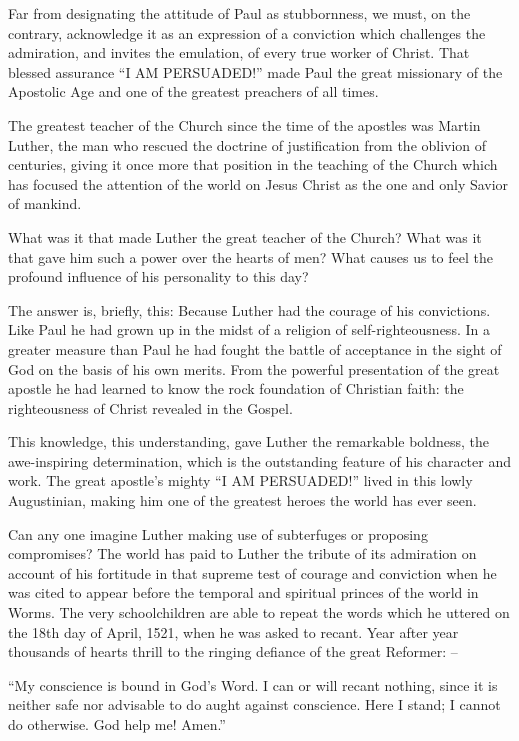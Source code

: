 \documentclass[
]{book}
\begin{document}
Far from designating the attitude of Paul as stubbornness, we must, on the contrary, acknowledge it as an expression of a conviction which challenges the admiration, and invites the emulation, of every true worker of Christ. That blessed assurance ``I AM PERSUADED!'' made Paul the great missionary of the Apostolic Age and one of the greatest preachers of all times.

The greatest teacher of the Church since the time of the apostles was Martin Luther, the man who rescued the doctrine of justification from the oblivion of centuries, giving it once more that position in the teaching of the Church which has focused the attention of the world on Jesus Christ as the one and only Savior of mankind.

What was it that made Luther the great teacher of the Church? What was it that gave him such a power over the hearts of men? What causes us to feel the profound influence of his personality to this day?

The answer is, briefly, this: Because Luther had the courage of his convictions. Like Paul he had grown up in the midst of a religion of self-righteousness. In a greater measure than Paul he had fought the battle of acceptance in the sight of God on the basis of his own merits. From the powerful presentation of the great apostle he had learned to know the rock foundation of Christian faith: the righteousness of Christ revealed in the Gospel.

This knowledge, this understanding, gave Luther the remarkable boldness, the awe-inspiring determination, which is the outstanding feature of his character and work. The great apostle's mighty ``I AM PERSUADED!'' lived in this lowly Augustinian, making him one of the greatest heroes the world has ever seen.

Can any one imagine Luther making use of subterfuges or proposing compromises? The world has paid to Luther the tribute of its admiration on account of his fortitude in that supreme test of courage and conviction when he was cited to appear before the temporal and spiritual princes of the world in Worms. The very schoolchildren are able to repeat the words which he uttered on the 18th day of April, 1521, when he was asked to recant. Year after year thousands of hearts thrill to the ringing defiance of the great Reformer: --

``My conscience is bound in God's Word. I can or will recant nothing, since it is neither safe nor advisable to do aught against conscience. Here I stand; I cannot do otherwise. God help me! Amen.''
\end{document}
